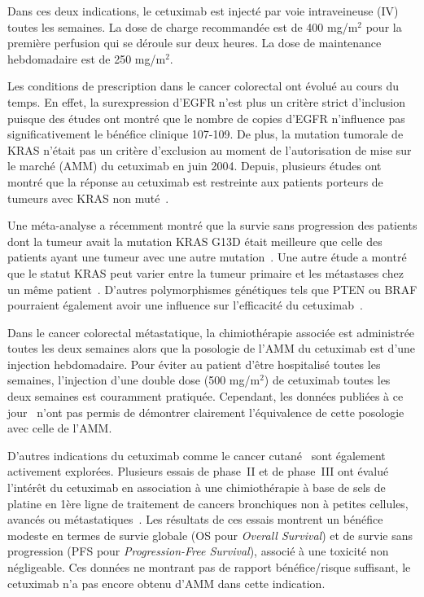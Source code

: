 Dans ces deux indications, le cetuximab est injecté par voie intraveineuse (\gls{IV}) toutes les semaines. La dose de charge recommandée est de 400 mg/m$^2$ pour la première perfusion qui se déroule sur deux heures. La dose de maintenance hebdomadaire est de 250 mg/m$^2$.

Les conditions de prescription dans le cancer colorectal ont évolué au cours du temps. En effet, la surexpression d'EGFR n'est plus un critère strict d'inclusion puisque des études ont montré que le nombre de copies d'EGFR n'influence pas significativement le bénéfice clinique 107-109. De plus, la mutation tumorale de KRAS n'était pas un critère d'exclusion au moment de l'autorisation de mise sur le marché (\gls{AMM}) du cetuximab en juin 2004. Depuis, plusieurs études ont montré que la réponse au cetuximab est restreinte aux patients porteurs de tumeurs avec KRAS non muté~\citep{REF110, REF111, REF112, REF113}.

Une méta-analyse a récemment montré que la survie sans progression des patients dont la tumeur avait la mutation KRAS G13D était meilleure que celle des patients ayant une tumeur avec une autre mutation~\citep{REF114}. Une autre étude a montré que le statut KRAS peut varier entre la tumeur primaire et les métastases chez un même patient~\citep{REF115}. D'autres polymorphismes génétiques tels que PTEN ou BRAF pourraient également avoir une influence sur l'efficacité du cetuximab~\citep{REF116, REF117}.

Dans le cancer colorectal métastatique, la chimiothérapie associée est administrée toutes les deux semaines alors que la posologie de l'\gls{AMM} du cetuximab est d'une injection hebdomadaire. Pour éviter au patient d'être hospitalisé toutes les semaines, l'injection d'une double dose (500 mg/m$^2$) de cetuximab toutes les deux semaines est couramment pratiquée. Cependant, les données publiées à ce jour~\citep{REF118} n'ont pas permis de démontrer clairement l'équivalence de cette posologie avec celle de l'\gls{AMM}. 

D'autres indications du cetuximab comme le cancer cutané~\citep{REF119} sont également activement explorées. Plusieurs essais de phase~II et de phase~III ont évalué l'intérêt du cetuximab en association à une chimiothérapie à base de sels de platine en 1ère ligne de traitement de cancers bronchiques non à petites cellules, avancés ou métastatiques~\citep{REF120, REF121}. Les résultats de ces essais montrent un bénéfice modeste en termes de survie globale (OS pour \textit{Overall Survival}) et de survie sans progression (PFS pour \textit{Progression-Free Survival}), associé à une toxicité non négligeable. Ces données ne montrant pas de rapport bénéfice/risque suffisant, le cetuximab n'a pas encore obtenu d'\gls{AMM} dans cette indication.


